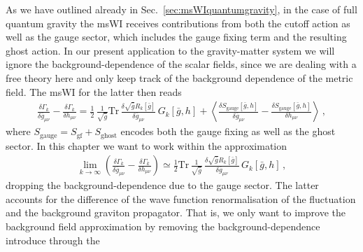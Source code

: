 \documentclass[11pt]{book}
\newcommand{\Tr}{\mathrm{Tr}}
\numberwithin{equation}{chapter}
\begin{document}
As we have outlined already in Sec.~\ref{sec:msWIquantumgravity},
in the case of full quantum gravity the msWI receives contributions
from both the cutoff action as well as the gauge sector, which includes
the gauge fixing term and the resulting ghost action.
In our present application to the gravity-matter system we
will ignore the background-dependence of the scalar fields,
since we are dealing with a free theory here and only
keep track of the background dependence of the metric field.
The msWI for the latter then reads
\begin{align}
  \frac{\delta \Gamma_k}{\delta\bar g_{\mu\nu}}
  -\frac{\delta \Gamma_k}{\delta h_{\mu\nu}}
  = \frac 12 \, \frac 1{\sqrt{\bar g}} \Tr \,
  \frac{\delta \sqrt{\bar g} R_k[\bar g]}{\delta \bar g_{\mu\nu}} \, G_k[\bar g, h]
  +
  \left\langle
    \frac{\delta S_{\mathrm{gauge}}[\bar g,h]}{\delta \bar g_{\mu\nu}}
    -\frac{\delta S_{\mathrm{gauge}}[\bar g,h]}{\delta h_{\mu\nu}}
  \right\rangle
  \,,
  \label{eq:gaugeNIk}
\end{align}
where $S_{\mathrm{gauge}}=S_{\mathrm{gf}}+S_{\mathrm{ghost}}$
encodes both the gauge fixing as well as the ghost sector.
In this chapter we want to work within the approximation
\begin{align}
  \lim_{k\to \infty}
  \left(
    \frac{\delta \Gamma_k}{\delta\bar g_{\mu\nu}}-\frac{\delta \Gamma_k}{\delta h_{\mu\nu}}
  \right)
  \simeq \frac 12 \Tr \,
  \frac{1}{ \sqrt{\bar g} } \, \frac{\delta\sqrt{\bar g} R_k[\bar g]}{\delta \bar g_{\mu\nu}} \, G_k[\bar g, h] \,,
  \label{eq:gravappNIk}
\end{align}
dropping the background-dependence due to the gauge sector.
The latter accounts for the difference of the wave function
renormalisation of the fluctuation and the background
graviton propagator.
That is, we only want to improve the background field approximation
by removing the background-dependence introduce through the
\end{document}
